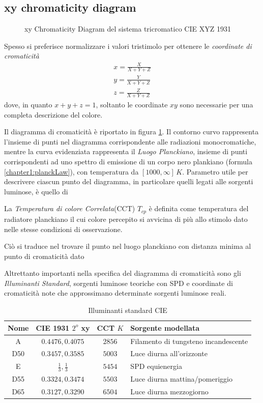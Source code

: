 \subsection{xy chromaticity diagram}
\begin{figure}[tb]
	
	\caption{xy Chromaticity Diagram del sistema tricromatico CIE XYZ 1931}
	\label{chapter2:colorimetry:cromaticityDiagram}
\end{figure}
Spesso si preferisce normalizzare i valori tristimolo per ottenere le \textit{coordinate di cromaticit\`a}
\begin{align}
	x = \frac{X}{X+Y+Z}\\
	y = \frac{Y}{X+Y+Z}\\
	z = \frac{Z}{X+Y+Z}
\end{align}
dove, in quanto $x+y+z=1$, soltanto le coordinate $xy$ sono necessarie per una completa descrizione del colore.\par
Il diagramma di cromaticit\`a \`e riportato in figura \ref{chapter2:colorimetry:cromaticityDiagram}. Il contorno curvo rappresenta l'insieme di punti
nel diagramma corrispondente alle radiazioni monocromatiche, mentre la curva evidenziata rappresenta il \textit{Luogo Planckiano}, insieme di punti
corrispondenti ad uno spettro di emissione di un corpo nero plankiano (formula \ref{chapter1:planckLaw}), con temperatura da $[1000,\infty]\,\si{K}$.
Parametro utile per descrivere ciascun punto del diagramma, in particolare quelli legati alle sorgenti luminose, \`e quello di
\begin{definitionS}
	La \textit{Temperatura di colore Correlata}(CCT) $T_{cp}$ \`e definita come temperatura del radiatore planckiano il cui colore percepito si
	avvicina di pi\`u allo stimolo dato nelle stesse condizioni di osservazione.\par
	Ci\`o si traduce nel trovare il punto nel luogo planckiano con distanza minima al punto di cromaticit\`a dato
\end{definitionS}
Altrettanto importanti nella specifica del diagramma di cromaticit\`a sono gli \textit{Illuminanti Standard}, sorgenti luminose teoriche con SPD e 
coordinate di cromaticit\`a note che approssimano determinate sorgenti luminose reali.
\begin{table}
	\begin{tabularx}{\linewidth}{cccY}
		\toprule
		Nome & CIE 1931 $2^o$ xy & CCT $\si{K}$ & Sorgente modellata\\
		\midrule
		A & $0.4476, 0.4075$ & $2856$ & Filamento di tungsteno incandescente\\
		D50 & $0.3457, 0.3585$ & $5003$ & Luce diurna all'orizzonte\\
		E & $\frac{1}{3}, \frac{1}{3}$ & $5454$ & SPD equienergia \\
		D55 & $0.3324, 0.3474$ & $5503$ & Luce diurna mattina/pomeriggio \\
		D65 & $0.3127, 0.3290$ & $6504$ & Luce diurna mezzogiorno\\
		\bottomrule
	\end{tabularx}
	\caption{Illuminanti standard CIE}
\end{table}
